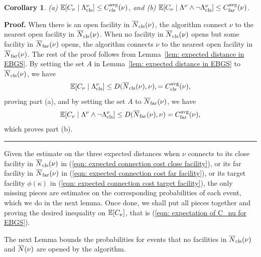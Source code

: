 \documentclass[oneside,final]{ucr}
\newtheorem{corollary}[theorem]{Corollary}
\newenvironment{proof}[1][Proof]{\textbf{#1.} }{\ \rule{0.5em}{0.5em}}
\begin{document}
\begin{corollary} \label{coro: EBGS close and far distance} 
%
{\rm (a)} $\mathbb{E}[C_{\nu} \mid \Lambda_{{\mbox{\scriptsize\rm cls}}}^\nu] \leq C_{{\mbox{\scriptsize\rm cls}}}^{{\mbox{\scriptsize\rm avg}}}(\nu)$,
and
{\rm (b)} $\mathbb{E}[C_{\nu} \mid \Lambda^\nu \wedge \neg \Lambda_{{\mbox{\scriptsize\rm cls}}}^\nu]
    			\leq C_{{\mbox{\scriptsize\rm far}}}^{{\mbox{\scriptsize\rm avg}}}(\nu)$.
\end{corollary}
\begin{proof}
When there is an open facility in ${\overline{N}}_{{\mbox{\scriptsize\rm cls}}}(\nu)$, the algorithm
  connect $\nu$ to the nearest open facility in
  ${\overline{N}}_{{\mbox{\scriptsize\rm cls}}}(\nu)$. When no facility in ${\overline{N}}_{{\mbox{\scriptsize\rm cls}}}(\nu)$ opens but
  some facility in ${\overline{N}}_{{\mbox{\scriptsize\rm far}}}(\nu)$ opens, the algorithm connects
  $\nu$ to the nearest open facility in ${\overline{N}}_{{\mbox{\scriptsize\rm far}}}(\nu)$. The rest of
  the proof follows from Lemma~\ref{lem: expected distance in
    EBGS}. By setting the set $A$ in Lemma~\ref{lem: expected distance
    in EBGS} to ${\overline{N}}_{{\mbox{\scriptsize\rm cls}}}(\nu)$, we have
%
  \begin{equation*}
    \mathbb{E}[C_{\nu} \mid \Lambda_{{\mbox{\scriptsize\rm cls}}}^\nu] \leq D({\overline{N}}_{{\mbox{\scriptsize\rm cls}}}(\nu), \nu),
    = C_{{\mbox{\scriptsize\rm cls}}}^{{\mbox{\scriptsize\rm avg}}}(\nu),
    \label{eqn: expected connection cost close facility}
  \end{equation*}
% 
proving part (a), and by setting the set $A$ to ${\overline{N}}_{{\mbox{\scriptsize\rm far}}}(\nu)$, we have
%
  \begin{equation*}
    \mathbb{E}[C_{\nu}
    \mid \Lambda^\nu \wedge \neg \Lambda_{{\mbox{\scriptsize\rm cls}}}^\nu] \leq
    D({\overline{N}}_{{\mbox{\scriptsize\rm far}}}(\nu), \nu) = C_{{\mbox{\scriptsize\rm far}}}^{{\mbox{\scriptsize\rm avg}}}(\nu),
    \label{eqn: expected connection cost far facility}
  \end{equation*}
which proves part (b).
\end{proof}

Given the estimate on the three expected distances when $\nu$ connects
to its close facility in ${\overline{N}}_{{\mbox{\scriptsize\rm cls}}}(\nu)$ in (\ref{eqn: expected
  connection cost close facility}), or its far facility in
${\overline{N}}_{{\mbox{\scriptsize\rm far}}}(\nu)$ in (\ref{eqn: expected connection cost far
  facility}), or its target facility $\phi(\kappa)$ in (\ref{eqn:
  expected connection cost target facility}), the only missing pieces
are estimates on the corresponding probabilities of each event, which
we do in the next lemma. Once done, we shall put all pieces together
and proving the desired inequality on $\mathbb{E}[C_{\nu}]$, that is
(\ref{eqn: expectation of C_nu for EBGS}).

The next Lemma bounds the probabilities for events
that no facilities in ${\overline{N}}_{{\mbox{\scriptsize\rm cls}}}(\nu)$ and ${\overline{N}}(\nu)$ are
opened by the algorithm.

\end{document}
